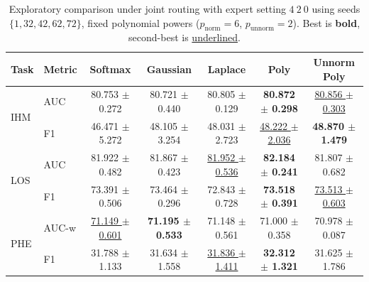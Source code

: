 \begin{table}[h]
\centering
\small
\setlength{\tabcolsep}{4pt}
\begin{tabular}{llccccc}
\toprule
Task & Metric & Softmax & Gaussian & Laplace & Poly & Unnorm Poly \\
\midrule
\multirow{2}{*}{IHM} & AUC & 80.753 $\pm$ 0.272 & 80.721 $\pm$ 0.440 & 80.805 $\pm$ 0.129 & \textbf{80.872 $\pm$ 0.298} & \underline{80.856 $\pm$ 0.303} \\
 & F1 & 46.471 $\pm$ 5.272 & 48.105 $\pm$ 3.254 & 48.031 $\pm$ 2.723 & \underline{48.222 $\pm$ 2.036} & \textbf{48.870 $\pm$ 1.479} \\
\midrule
\multirow{2}{*}{LOS} & AUC & 81.922 $\pm$ 0.482 & 81.867 $\pm$ 0.423 & \underline{81.952 $\pm$ 0.536} & \textbf{82.184 $\pm$ 0.241} & 81.807 $\pm$ 0.682 \\
 & F1 & 73.391 $\pm$ 0.506 & 73.464 $\pm$ 0.296 & 72.843 $\pm$ 0.728 & \textbf{73.518 $\pm$ 0.391} & \underline{73.513 $\pm$ 0.603} \\
\midrule
\multirow{2}{*}{PHE} & AUC-w & \underline{71.149 $\pm$ 0.601} & \textbf{71.195 $\pm$ 0.533} & 71.148 $\pm$ 0.561 & 71.000 $\pm$ 0.358 & 70.978 $\pm$ 0.087 \\
 & F1 & 31.788 $\pm$ 1.133 & 31.634 $\pm$ 1.558 & \underline{31.836 $\pm$ 1.411} & \textbf{32.312 $\pm$ 1.321} & 31.625 $\pm$ 1.786 \\
\bottomrule
\end{tabular}
\caption{Exploratory comparison under joint routing with expert setting $4\ 2\ 0$ using seeds $\{1,32,42,62,72\}$, fixed polynomial powers ($p_\text{norm}=6$, $p_\text{unnorm}=2$). Best is \textbf{bold}, second-best is \underline{underlined}.}
\label{tab:explore5seed_constp6p2_5seed_132426272_joint420_gating_table}
\end{table}
